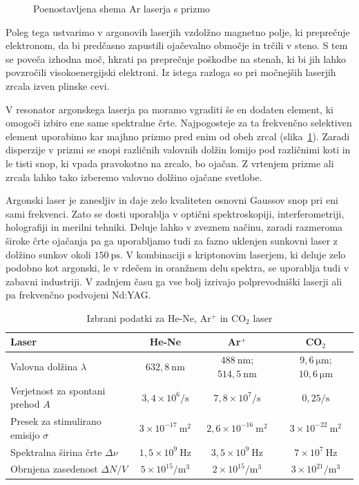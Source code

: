 \begin{figure}[h]
\centering
\def\svgwidth{90truemm} 

\caption{Poenostavljena shema Ar laserja s prizmo}
\label{fig:ArS}
\end{figure}

Poleg tega ustvarimo v argonovih laserjih vzdolžno magnetno polje, ki preprečuje 
elektronom, da bi predčasno zapustili ojačevalno območje in trčili v steno. S
tem se poveča izhodna moč, hkrati pa preprečuje poškodbe na stenah, ki bi jih 
lahko povzročili visokoenergijski elektroni. Iz istega razloga so pri močnejših
laserjih zrcala izven plinske cevi. 

V resonator argonskega laserja pa moramo vgraditi še en dodaten element, ki omogoči
izbiro ene same spektralne črte. Najpogosteje za ta frekvenčno selektiven element
uporabimo kar majhno prizmo pred enim od obeh zrcal (slika~\ref{fig:ArS}). Zaradi disperzije
v prizmi se snopi različnih valovnih dolžin lomijo pod različnimi koti in le tisti 
snop, ki vpada pravokotno na zrcalo, bo ojačan. Z vrtenjem prizme ali zrcala lahko 
tako izberemo valovno dolžino ojačane svetlobe.

Argonski laser je zanesljiv in daje zelo kvaliteten osnovni Gaussov snop pri eni
sami frekvenci. Zato se dosti uporablja v optični spektroskopiji,
interferometriji, holografiji in merilni tehniki. Deluje lahko v zveznem načinu,
zaradi razmeroma široke črte ojačanja pa ga uporabljamo tudi za fazno uklenjen
sunkovni laser z dolžino sunkov okoli $150~\si{\pico\second}$. 
V kombinaciji s kriptonovim laserjem, ki deluje zelo podobno kot argonski, 
le v rdečem in oranžnem delu spektra, se uporablja tudi v zabavni industriji.
V zadnjem času ga vse bolj izrivajo polprevodniški laserji ali pa frekvenčno
podvojeni Nd:YAG. 

\begin{table}
\begin{center}
\begin{tabular}{|l|c|c|c|}\hline
Laser & He-Ne & Ar$^+$ & CO$_2$ \\ \hline
Valovna dolžina  $\lambda$ & $632,8~\si{\nano\metre}$& $488~\si{\nano\metre}$;
$514,5~\si{\nano\metre}$ & $9,6~\si{\micro\metre}$; $10,6~\si{\micro\metre}$
\\ \hline
Verjetnost za spontani prehod $A$ & $3,4 \times 10^6/\si{\second}$ & 
$7,8 \times 10^7/\si{\second}$ & $0,25/\si{\second}$  \\ \hline
Presek za stimulirano emisijo $\sigma$ & $3 \times 10^{-17}~\si{\metre}^2$&  $2,6 \times 10^{-16}~\si{\metre}^2$ & $3 \times 10^{-22}~\si{\metre}^2$ \\ \hline
Spektralna širina črte $\Delta \nu$ & $1,5 \times 10^{9}~\si{\hertz}$ & 
$3,5 \times 10^{9}~\si{\hertz}$ &$7 \times 10^{7}~\si{\hertz}$  \\ \hline
Obrnjena zasedenost $\Delta N/V$ & $5 \times 10^{15}/\si{\metre}^3$ & $2 \times 10^{15}/\si{\metre}^3$ & $3 \times 10^{21}/\si{\metre}^3$ \\ \hline
\end{tabular}
\caption{Izbrani podatki za He-Ne, Ar$^+$ in CO$_2$ laser}
\label{tab:Ar}
\end{center}
\end{table}

